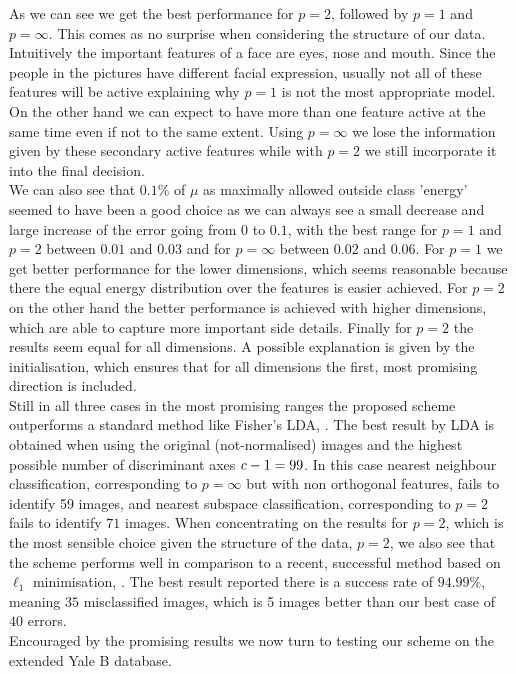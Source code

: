 \documentclass[11pt]{article}
\begin{document}
As we can see we get the best performance for $p=2$, followed by $p=1$ and $p=\infty$. This comes as no surprise when considering the structure of our data. Intuitively the important features of a face are eyes, nose and mouth. Since the people in the pictures have different facial expression, usually not all of these features will be active explaining why $p=1$ is not the most appropriate model. On the other hand
we can expect to have more than one feature active at the same time even if not to the same extent. Using $p=\infty$ we lose the information given by these secondary active features while with $p=2$ we still incorporate it into the final decision.\\
We can also see that $0.1\%$ of $\mu$ as maximally allowed outside class 'energy' seemed to have been a good choice as we can always see a small decrease and large increase of the error going from $0$ to $0.1$, with the best range for $p=1$ and $p=2$ between $0.01$ and $0.03$ and for $p=\infty$ between $0.02$ and $0.06$. For $p=1$ we get better performance for the lower dimensions, which seems reasonable because there the equal energy distribution over the features is easier achieved. For $p=2$ on the other hand the better performance is achieved with higher dimensions, which are able to capture more important side details. Finally for $p=2$ the results seem equal for all dimensions. A possible explanation is given by the initialisation, which ensures that for all dimensions the first, most promising direction is included.\\
Still in all three cases in the most promising ranges the proposed scheme outperforms a standard method like Fisher's LDA, \cite{lda}. The best result by LDA is obtained when using the original (not-normalised) images and the highest possible number of discriminant axes ${c}-1=99$. In this case nearest neighbour classification, corresponding to $p=\infty$ but with non orthogonal features, fails to identify 59 images, and nearest subspace classification, corresponding to $p=2$ fails to identify $71$ images.
When concentrating on the results for $p=2$, which is the most sensible choice given the structure of the data, $p=2$, we also see that the scheme performs well in comparison to a recent, successful method based on $\ell_1$ minimisation, \cite{wrma09}. The best result reported there is a success rate of $94.99\%$, meaning $35$ misclassified images, which is 5 images better than our best case of $40$ errors.\\
Encouraged by the promising results we now turn to testing our scheme on the extended Yale B database.
\end{document}
